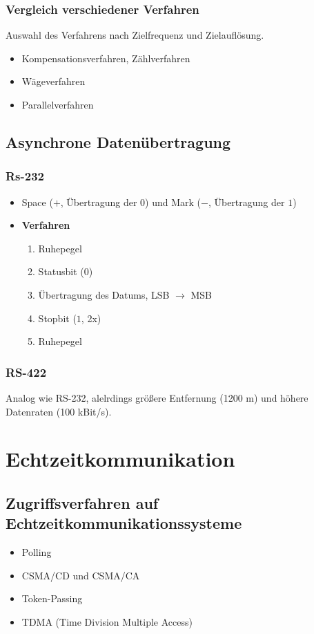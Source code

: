 \subsubsection{Vergleich verschiedener Verfahren}
Auswahl des Verfahrens nach Zielfrequenz und Zielauflösung.
\begin{itemize}
	\item Kompensationsverfahren, Zählverfahren
	\item Wägeverfahren
	\item Parallelverfahren
\end{itemize}


\subsection{Asynchrone Datenübertragung}

\subsubsection{Rs-232}

\begin{itemize}
	\item Space ($+$, Übertragung der $0$) und Mark ($-$, Übertragung der $1$)
	\item \textbf{Verfahren}
	\begin{enumerate}
		\item Ruhepegel
		\item Statusbit ($0$)
		\item Übertragung des Datums, LSB $\rightarrow$ MSB
		\item Stopbit ($1$, 2x)
		\item Ruhepegel
	\end{enumerate}
\end{itemize}

\subsubsection{RS-422}
Analog wie RS-232, alelrdings größere Entfernung (1200 m) und höhere Datenraten (100 kBit/s).



\section{Echtzeitkommunikation}

\subsection{Zugriffsverfahren auf Echtzeitkommunikationssysteme}
\begin{itemize}
	\item Polling
	\item CSMA/CD und CSMA/CA
	\item Token-Passing
	\item TDMA (Time Division Multiple Access)
\end{itemize}


